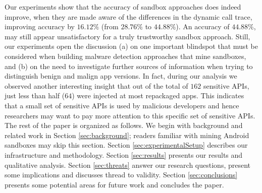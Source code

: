 Our experiments show that the accuracy of sandbox approaches does indeed improve, when they are made aware of the differences in the dynamic call trace, improving accuracy by $16.12\%$ (from $28.76\%$ to $44.88\%$). 
An accuracy of $44.88\%$, may still appear unsatisfactory for a truly trustworthy sandbox approach. Still, 
our experiments open the discussion (a) on one important blindspot that must be considered when building 
malware detection approaches that mine sandboxes, and (b) on the need to investigate further sources of information when trying to distinguish benign and malign app versions. 
In fact, during our analysis we observed another interesting insight that out of the total of $162$ sensitive APIs, just less than half ($64$) were injected at most repackaged apps. 
This indicates that a small set of sensitive APIs is used by malicious developers and hence 
researchers may want to pay more attention to this specific set of sensitive APIs.\\




The rest of the paper is organized as follows. We begin with background and related work in Section \ref{sec:background};
readers familiar with mining Android sandboxes may skip this section.
Section \ref{sec:experimentalSetup} describes our infrastructure and methodology. Section \ref{sec:results} presents our results and qualitative analysis. Section \ref{sec:threats} answer our research questions, present some implications and discusses thread to validity. Section \ref{sec:conclusions} 
presents some potential areas for future work and concludes the paper.
